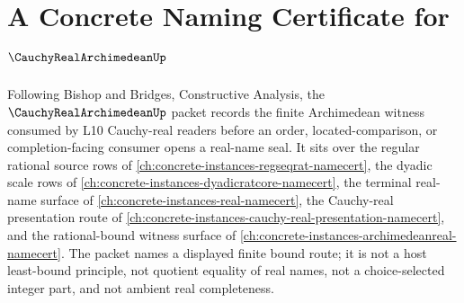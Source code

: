 \chapter{A Concrete Naming Certificate for $\CauchyRealArchimedeanUp$}
\label{ch:concrete-instances-cauchy-real-archimedean-namecert}

Following Bishop and Bridges, Constructive Analysis, the $\CauchyRealArchimedeanUp$ packet records the finite Archimedean witness consumed by L10 Cauchy-real readers before an order, located-comparison, or completion-facing consumer opens a real-name seal. It sits over the regular rational source rows of \autoref{ch:concrete-instances-regseqrat-namecert}, the dyadic scale rows of \autoref{ch:concrete-instances-dyadicratcore-namecert}, the terminal real-name surface of \autoref{ch:concrete-instances-real-namecert}, the Cauchy-real presentation route of \autoref{ch:concrete-instances-cauchy-real-presentation-namecert}, and the rational-bound witness surface of \autoref{ch:concrete-instances-archimedeanreal-namecert}. The packet names a displayed finite bound route; it is not a host least-bound principle, not quotient equality of real names, not a choice-selected integer part, and not ambient real completeness.

